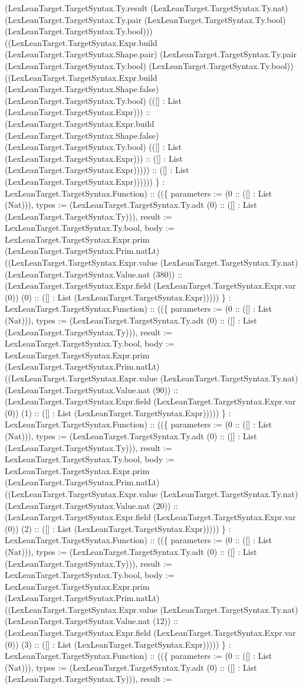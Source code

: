 \documentclass[11pt]{article}
\begin{document}
(LexLeanTarget.TargetSyntax.Ty.result (LexLeanTarget.TargetSyntax.Ty.nat) (LexLeanTarget.TargetSyntax.Ty.pair (LexLeanTarget.TargetSyntax.Ty.bool) (LexLeanTarget.TargetSyntax.Ty.bool))) ((LexLeanTarget.TargetSyntax.Expr.build (LexLeanTarget.TargetSyntax.Shape.pair) (LexLeanTarget.TargetSyntax.Ty.pair (LexLeanTarget.TargetSyntax.Ty.bool) (LexLeanTarget.TargetSyntax.Ty.bool)) ((LexLeanTarget.TargetSyntax.Expr.build (LexLeanTarget.TargetSyntax.Shape.false) (LexLeanTarget.TargetSyntax.Ty.bool) (([] : List (LexLeanTarget.TargetSyntax.Expr))) :: (LexLeanTarget.TargetSyntax.Expr.build (LexLeanTarget.TargetSyntax.Shape.false) (LexLeanTarget.TargetSyntax.Ty.bool) (([] : List (LexLeanTarget.TargetSyntax.Expr))) :: ([] : List (LexLeanTarget.TargetSyntax.Expr))))) :: ([] : List (LexLeanTarget.TargetSyntax.Expr)))))) \} : LexLeanTarget.TargetSyntax.Function) :: ((\{ parameters := (0 :: ([] : List (Nat))), types := (LexLeanTarget.TargetSyntax.Ty.adt (0) :: ([] : List (LexLeanTarget.TargetSyntax.Ty))), result := LexLeanTarget.TargetSyntax.Ty.bool, body := LexLeanTarget.TargetSyntax.Expr.prim (LexLeanTarget.TargetSyntax.Prim.natLt) ((LexLeanTarget.TargetSyntax.Expr.value (LexLeanTarget.TargetSyntax.Ty.nat) (LexLeanTarget.TargetSyntax.Value.nat (380)) :: (LexLeanTarget.TargetSyntax.Expr.field (LexLeanTarget.TargetSyntax.Expr.var (0)) (0) :: ([] : List (LexLeanTarget.TargetSyntax.Expr))))) \} : LexLeanTarget.TargetSyntax.Function) :: ((\{ parameters := (0 :: ([] : List (Nat))), types := (LexLeanTarget.TargetSyntax.Ty.adt (0) :: ([] : List (LexLeanTarget.TargetSyntax.Ty))), result := LexLeanTarget.TargetSyntax.Ty.bool, body := LexLeanTarget.TargetSyntax.Expr.prim (LexLeanTarget.TargetSyntax.Prim.natLt) ((LexLeanTarget.TargetSyntax.Expr.value (LexLeanTarget.TargetSyntax.Ty.nat) (LexLeanTarget.TargetSyntax.Value.nat (90)) :: (LexLeanTarget.TargetSyntax.Expr.field (LexLeanTarget.TargetSyntax.Expr.var (0)) (1) :: ([] : List (LexLeanTarget.TargetSyntax.Expr))))) \} : LexLeanTarget.TargetSyntax.Function) :: ((\{ parameters := (0 :: ([] : List (Nat))), types := (LexLeanTarget.TargetSyntax.Ty.adt (0) :: ([] : List (LexLeanTarget.TargetSyntax.Ty))), result := LexLeanTarget.TargetSyntax.Ty.bool, body := LexLeanTarget.TargetSyntax.Expr.prim (LexLeanTarget.TargetSyntax.Prim.natLt) ((LexLeanTarget.TargetSyntax.Expr.value (LexLeanTarget.TargetSyntax.Ty.nat) (LexLeanTarget.TargetSyntax.Value.nat (20)) :: (LexLeanTarget.TargetSyntax.Expr.field (LexLeanTarget.TargetSyntax.Expr.var (0)) (2) :: ([] : List (LexLeanTarget.TargetSyntax.Expr))))) \} : LexLeanTarget.TargetSyntax.Function) :: ((\{ parameters := (0 :: ([] : List (Nat))), types := (LexLeanTarget.TargetSyntax.Ty.adt (0) :: ([] : List (LexLeanTarget.TargetSyntax.Ty))), result := LexLeanTarget.TargetSyntax.Ty.bool, body := LexLeanTarget.TargetSyntax.Expr.prim (LexLeanTarget.TargetSyntax.Prim.natLt) ((LexLeanTarget.TargetSyntax.Expr.value (LexLeanTarget.TargetSyntax.Ty.nat) (LexLeanTarget.TargetSyntax.Value.nat (12)) :: (LexLeanTarget.TargetSyntax.Expr.field (LexLeanTarget.TargetSyntax.Expr.var (0)) (3) :: ([] : List (LexLeanTarget.TargetSyntax.Expr))))) \} : LexLeanTarget.TargetSyntax.Function) :: ((\{ parameters := (0 :: ([] : List (Nat))), types := (LexLeanTarget.TargetSyntax.Ty.adt (0) :: ([] : List (LexLeanTarget.TargetSyntax.Ty))), result := 
\end{document}
